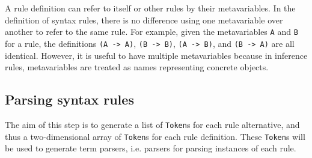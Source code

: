 A rule definition can refer to itself or other rules by their metavariables. In the definition of syntax rules, there is no difference using one metavariable over another to refer to the same rule. For example, given the metavariables \lstinline{A} and \lstinline{B} for a rule, the definitions \lstinline{(A -> A)}, \lstinline{(B -> B)}, \lstinline{(A -> B)}, and \lstinline{(B -> A)} are all identical. However, it is useful to have multiple metavariables because in inference rules, metavariables are treated as names representing concrete objects.

\subsection{Parsing syntax rules}
\label{syntax:parsing}
The aim of this step is to generate a list of \lstinline{Token}s for each rule alternative, and thus a two-dimensional array of \lstinline{Token}s for each rule definition. These \lstinline{Token}s will be used to generate term parsers, i.e. parsers for parsing instances of each rule.

